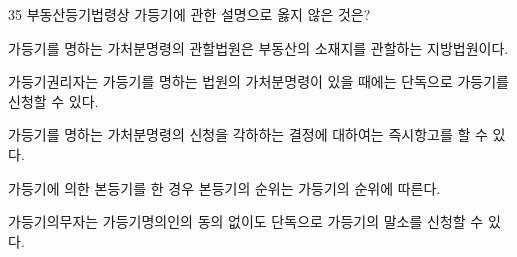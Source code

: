 \begin{question}{35}
부동산등기법령상 가등기에 관한 설명으로 옳지 않은 것은?
\begin{choices}
  \item 가등기를 명하는 가처분명령의 관할법원은 부동산의 소재지를 관할하는 지방법원이다.
  \item 가등기권리자는 가등기를 명하는 법원의 가처분명령이 있을 때에는 단독으로 가등기를 신청할 수 있다.
  \item 가등기를 명하는 가처분명령의 신청을 각하하는 결정에 대하여는 즉시항고를 할 수 있다.
  \item 가등기에 의한 본등기를 한 경우 본등기의 순위는 가등기의 순위에 따른다.
  \item 가등기의무자는 가등기명의인의 동의 없이도 단독으로 가등기의 말소를 신청할 수 있다.
\end{choices}
\end{question}

